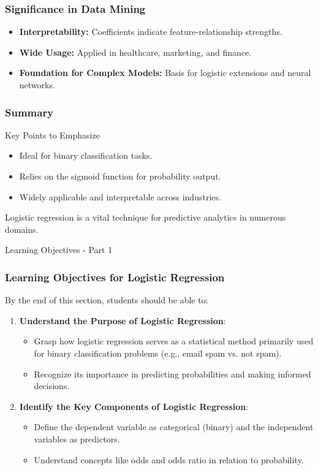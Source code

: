 \documentclass[aspectratio=169]{beamer}
\begin{document}
\begin{frame}[fragile]
    \frametitle{Significance in Data Mining}
    \begin{itemize}
        \item \textbf{Interpretability:} Coefficients indicate feature-relationship strengths.
        \item \textbf{Wide Usage:} Applied in healthcare, marketing, and finance.
        \item \textbf{Foundation for Complex Models:} Basis for logistic extensions and neural networks.
    \end{itemize}
\end{frame}

\begin{frame}[fragile]
    \frametitle{Summary}
    \begin{block}{Key Points to Emphasize}
        \begin{itemize}
            \item Ideal for binary classification tasks.
            \item Relies on the sigmoid function for probability output.
            \item Widely applicable and interpretable across industries.
        \end{itemize}
    \end{block}
    
    Logistic regression is a vital technique for predictive analytics in numerous domains.
\end{frame}

\begin{frame}[fragile]{Learning Objectives - Part 1}
    \frametitle{Learning Objectives for Logistic Regression}
    By the end of this section, students should be able to:
    \begin{enumerate}
        \item \textbf{Understand the Purpose of Logistic Regression}:
        \begin{itemize}
            \item Grasp how logistic regression serves as a statistical method primarily used for binary classification problems (e.g., email spam vs. not spam).
            \item Recognize its importance in predicting probabilities and making informed decisions.
        \end{itemize}
        
        \item \textbf{Identify the Key Components of Logistic Regression}:
        \begin{itemize}
            \item Define the dependent variable as categorical (binary) and the independent variables as predictors.
            \item Understand concepts like odds and odds ratio in relation to probability.
        \end{itemize}
    \end{enumerate}
\end{frame}
\end{document}
